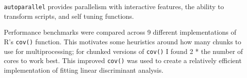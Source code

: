 \documentclass[12pt]{article}
\begin{document}
\texttt{autoparallel} provides parallelism with interactive features, the
ability to transform scripts, and self tuning functions.

Performance benchmarks were compared across 9 different implementations of
R's \texttt{cov()} function. This motivates some heuristics around how many
chunks to use for multiprocessing; for chunked versions of \texttt{cov()} I
found 2 * the number of cores to work best. This improved \texttt{cov()}
was used to create a relatively efficient implementation of fitting linear discriminant
analysis.

\hfill


 
\end{document}
